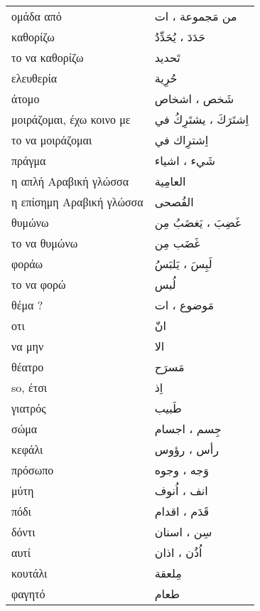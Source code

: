 \documentclass[twocolumn,a4paper]{article}
\newcommand{\ar}[1]{\textarabic{#1}}
\newcommand{\pl}{\raisebox{0.15ex}{\footnotesize ◍}}
\newcommand{\normpl}[1]{\ar{ #1، ات }}
\newcommand{\vrf}{\raisebox{0.15ex}{\footnotesize ◉}}
\newcommand{\mas}{\raisebox{0.15ex}{\footnotesize ◫}}
\begin{document}
\begin{mpsupertabular}{ P{0.5\textwidth} P{0.5\textwidth} }
ομάδα από \pl                & \ar{من} \normpl{ مَجموعة } \\
καθορίζω \vrf                & \ar{ حَدَدَ ، يُحَدِّدُ } \\
το να καθορίζω \mas          & \ar{ تَحديد } \\
ελευθερία                    & \ar{ حُرِية } \\
άτομο \pl                    & \ar{ شَخص ، اشخاص } \\
μοιράζομαι, έχω κοινο με \vrf & \ar{ اِشتَرَكَ ، يشتَرِكُ في } \\
το να μοιράζομαι \mas        & \ar{ اِشترِاك في } \\
πράγμα \pl                   & \ar{ شَيء ، اشياء } \\
η απλή Αραβική γλώσσα        & \ar{ العامِية } \\
η επίσημη Αραβική γλώσσα     & \ar{ الفُصحى } \\
θυμώνω \vrf                  & \ar{ غَضِبَ ، يَغضَبُ مِن }  \\
το να θυμώνω \mas            & \ar{ غَضَب مِن } \\
φοράω \vrf                   & \ar{ لَبِسَ ، يَلبَسُ } \\
το να φορώ \mas              & \ar{ لُبس } \\
θέμα ?                       & \normpl{ مَوضوع } \\
οτι                          & \ar{ انّ } \\
να μην                       & \ar{ الا } \\
θέατρο                       & \ar{ مَسرَح } \\
so, έτσι                     & \ar{ اِذ } \\
γιατρός                      & \ar{ طَبيب } \\
σώμα \pl                     & \ar{ جِسم ، اجسام } \\
κεφάλι \pl                   & \ar{ رأس ، رؤوس } \\
πρόσωπο \pl                  & \ar{ وَجه ، وجوه } \\
μύτη \pl                     & \ar{ انف ، اُنوف } \\
πόδι \pl                     & \ar{ قَدَم ، اقدام } \\
δόντι \pl                    & \ar{ سِن ، اسنان } \\
αυτί \pl                     & \ar{ اُذُن ، اذان } \\
κουτάλι                      & \ar{ مِلعقة } \\
φαγητό                       & \ar{ طعام } \\

\end{mpsupertabular}
\end{document}
